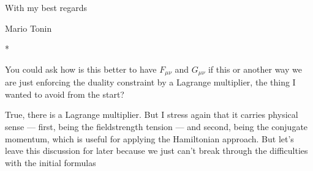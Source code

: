 \documentclass[epsfig,12pt]{article}
\begin{document}
With  my  best  regards

                                     Mario  Tonin

\vspace{1.0cm}
\centerline{* \qquad\qquad\qquad\qquad * \qquad\qquad\qquad\qquad *}
\vspace{1.0cm}


	You could ask how is this better to have $ F_{\mu\nu} $ and $ G_{\mu\nu} $
	if this or another way we are just enforcing the duality constraint by a Lagrange multiplier,
	the thing I wanted to avoid from the start?
	
	True, there is a Lagrange multiplier. 
	But I stress again that it carries physical sense --- first, being the fieldstrength tension
	--- and second, being the conjugate momentum, which is useful for applying the Hamiltonian approach.
	But let's leave this discussion for later because we just can't break through
	the difficulties with the initial formulas
\end{document}
